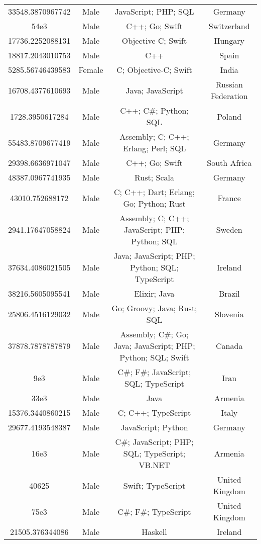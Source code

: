 \begin{center}
\begin{tabular}{ |c|c|c|c| }
33548.3870967742  &  Male  &  JavaScript; PHP; SQL  &  Germany  \\ 
54e3  &  Male  &  C++; Go; Swift  &  Switzerland  \\ 
17736.2252088131  &  Male  &  Objective-C; Swift  &  Hungary  \\ 
18817.2043010753  &  Male  &  C++  &  Spain  \\ 
5285.56746439583  &  Female  &  C; Objective-C; Swift  &  India  \\ 
16708.4377610693  &  Male  &  Java; JavaScript  &  Russian Federation  \\ 
1728.3950617284  &  Male  &  C++; C\#; Python; SQL  &  Poland  \\ 
55483.8709677419  &  Male  &  Assembly; C; C++; Erlang; Perl; SQL  &  Germany  \\ 
29398.6636971047  &  Male  &  C++; Go; Swift  &  South Africa  \\ 
48387.0967741935  &  Male  &  Rust; Scala  &  Germany  \\ 
43010.752688172  &  Male  &  C; C++; Dart; Erlang; Go; Python; Rust  &  France  \\ 
2941.17647058824  &  Male  &  Assembly; C; C++; JavaScript; PHP; Python; SQL  &  Sweden  \\ 
37634.4086021505  &  Male  &  Java; JavaScript; PHP; Python; SQL; TypeScript  &  Ireland  \\ 
38216.5605095541  &  Male  &  Elixir; Java  &  Brazil  \\ 
25806.4516129032  &  Male  &  Go; Groovy; Java; Rust; SQL  &  Slovenia  \\ 
37878.7878787879  &  Male  &  Assembly; C\#; Go; Java; JavaScript; PHP; Python; SQL; Swift  &  Canada  \\ 
9e3  &  Male  &  C\#; F\#; JavaScript; SQL; TypeScript  &  Iran  \\ 
33e3  &  Male  &  Java  &  Armenia  \\ 
15376.3440860215  &  Male  &  C; C++; TypeScript  &  Italy  \\ 
29677.4193548387  &  Male  &  JavaScript; Python  &  Germany  \\ 
16e3  &  Male  &  C\#; JavaScript; PHP; SQL; TypeScript; VB.NET  &  Armenia  \\ 
40625  &  Male  &  Swift; TypeScript  &  United Kingdom  \\ 
75e3  &  Male  &  C\#; F\#; TypeScript  &  United Kingdom  \\ 
21505.376344086  &  Male  &  Haskell  &  Ireland  \\ 

\end{tabular}
\end{center}
